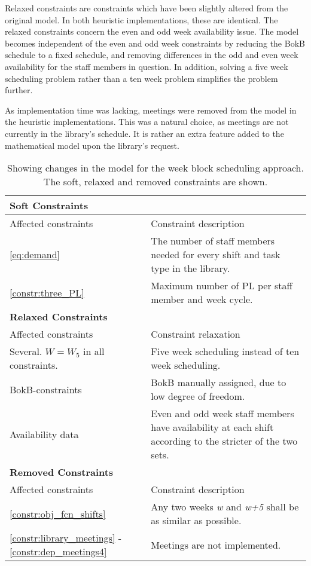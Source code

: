 Relaxed constraints are constraints which have been slightly altered from the original model. In both heuristic implementations, these are identical. The relaxed constraints concern the even and odd week availability issue. The model becomes independent of the even and odd week constraints by reducing the BokB schedule to a fixed schedule, and removing differences in the odd and even week availability for the staff members in question. In addition, solving a five week scheduling problem rather than a ten week problem simplifies the problem further.

As implementation time was lacking, meetings were removed from the model in the heuristic implementations. This was a natural choice, as meetings are not currently in the library's schedule. It is rather an extra feature added to the mathematical model upon the library's request.

\begin{table}[!h]
\centering
\caption{Showing changes in the model for the week block scheduling approach. The soft, relaxed and removed constraints are shown.}
\label{tab:weekly_task_constraints}
\begin{tabular}{|p{4cm}|p{7cm}|}
\hline
\multicolumn{2}{|l|}{\cellcolor{gray!90} \textbf{Soft Constraints}} \\
\hline 
\rowcolor{Gray} Affected constraints & Constraint description \\ \hline
\ref{eq:demand} & The number of staff members needed for every shift and task type in the library.  \\ \hline
\ref{constr:three_PL} & Maximum number of PL per staff member and week cycle. \\ \hline
\multicolumn{2}{|l|}{\cellcolor{gray!90} \textbf{Relaxed Constraints}} \\
\hline 
\rowcolor{Gray} Affected constraints & Constraint relaxation \\ \hline
Several. $W = W_5$ in all constraints. & Five week scheduling instead of ten week scheduling. \\ \hline
BokB-constraints & BokB manually assigned, due to low degree of freedom. \\ \hline
Availability data & Even and odd week staff members have availability at each shift according to the stricter of the two sets. \\ \hline
\multicolumn{2}{|l|}{\cellcolor{gray!90} \textbf{Removed Constraints}} \\
\hline 
\rowcolor{Gray} Affected constraints & Constraint description \\ \hline
\ref{constr:obj_fcn_shifts} & Any two weeks \textit{w} and \textit{w+5} shall be as similar as possible. \\ \hline
\ref{constr:library_meetings} - \ref{constr:dep_meetings4} & Meetings are not implemented. \\ \hline
\end{tabular}
\end{table}



